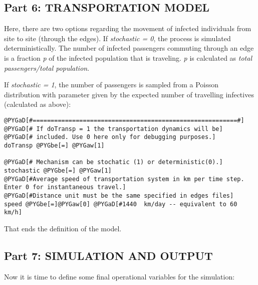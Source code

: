 \documentclass[a4paper,10pt]{manual}
\begin{document}
\subsection{Part 6: TRANSPORTATION MODEL}

Here, there are two options regarding the movement of infected individuals from site to site (through the edges). If \emph{stochastic = 0}, the process is simulated deterministically. The number of infected passengers commuting through an edge is a fraction \emph{p} of the infected population that is traveling. \emph{p} is calculated as \emph{total passengers/total population}.

If \emph{stochastic = 1}, the number of passengers is sampled from a Poisson distribution with parameter given by the expected number of travelling infectives (calculated as above):

\begin{Verbatim}[commandchars=@\[\]]
@PYGaD[#=========================================================#]
@PYGaD[# If doTransp = 1 the transportation dynamics will be]
@PYGaD[# included. Use 0 here only for debugging purposes.]
doTransp @PYGbe[=] @PYGaw[1]

@PYGaD[# Mechanism can be stochatic (1) or deterministic(0).]
stochastic @PYGbe[=] @PYGaw[1]
@PYGaD[#Average speed of transportation system in km per time step. Enter 0 for instantaneous travel.]
@PYGaD[#Distance unit must be the same specified in edges files]
speed @PYGbe[=]@PYGaw[0] @PYGaD[#1440  km/day -- equivalent to 60 km/h]
\end{Verbatim}

That ends the definition of the model.


\subsection{Part 7: SIMULATION AND OUTPUT}

Now it is time to define some final operational variables for the simulation:
\end{document}
